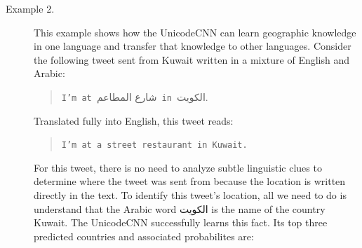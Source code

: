 \documentclass[sigconf,anonymous,review]{acmart}
\newcommand{\str}[1]{\texttt{#1}}
\begin{document}
\begin{description}
\item[Example 2.]
    This example shows how the UnicodeCNN can learn geographic knowledge in one language and transfer that knowledge to other languages.
Consider the following tweet sent from Kuwait written in a mixture of English and Arabic:
\begin{quote}
\str{I'm at }\foreignlanguage{arabic}{شارع المطاعم}\str{ in }\foreignlanguage{arabic}{الكويت}.%
\end{quote}
Translated fully into English, this tweet reads:
\begin{quote}
    \str{I'm at a street restaurant in Kuwait.}
\end{quote}
For this tweet, there is no need to analyze subtle linguistic clues to determine where the tweet was sent from because the location is written directly in the text.
To identify this tweet's location, all we need to do is understand that the Arabic word 
\foreignlanguage{arabic}{الكويت}
is the name of the country Kuwait.
The UnicodeCNN successfully learns this fact. 
Its top three predicted countries and associated probabilites are:

\noindent



\end{description}
\end{document}
